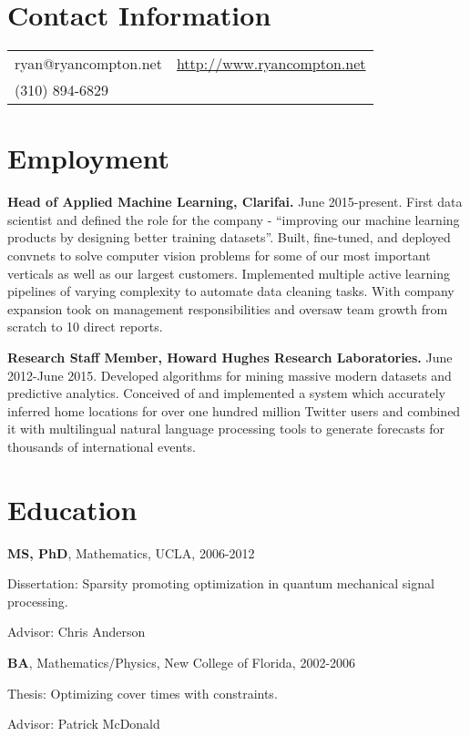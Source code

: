 \documentclass[margin,line]{res}
\newenvironment{list1}{
  \begin{list}{\ding{113}}{%
      \setlength{\itemsep}{0.0in}
      \setlength{\parsep}{0in} \setlength{\parskip}{0in}
      \setlength{\topsep}{0in} \setlength{\partopsep}{0in}
      \setlength{\leftmargin}{0.17in}}}{\end{list}}
\begin{document}

\begin{resume}
\section{\sc Contact Information}
\vspace{.05in}
\begin{tabular}{@{}p{2in}p{4in}}
    ryan@ryancompton.net   &  \url{http://www.ryancompton.net} \\
(310) 894-6829 & \\
\end{tabular}

\section{\sc Employment}
    {\bf Head of Applied Machine Learning, Clarifai.} June 2015-present. First data scientist and defined the role for the company - ``improving our machine learning products by designing better training datasets''. Built, fine-tuned, and deployed convnets to solve computer vision problems for some of our most important verticals as well as our largest customers. Implemented multiple active learning pipelines of varying complexity to automate data cleaning tasks. With company expansion took on management responsibilities and oversaw team growth from scratch to 10 direct reports.

    {\bf Research Staff Member, Howard Hughes Research Laboratories.} June 2012-June 2015. Developed algorithms for mining massive modern datasets and predictive analytics. Conceived of and implemented a system which accurately inferred home locations for over one hundred million Twitter users and combined it with multilingual natural language processing tools to generate forecasts for thousands of international events.

\section{\sc Education}
    {\bf MS, PhD}, Mathematics, UCLA, 2006-2012\\
\vspace*{-.1in}
\begin{list1}
\item [] Dissertation: Sparsity promoting optimization in quantum mechanical signal processing.
\item [] Advisor: Chris Anderson
\end{list1}
    {\bf BA}, Mathematics/Physics, New College of Florida, 2002-2006\\
\vspace*{-.1in}
\begin{list1}
\item [] Thesis: Optimizing cover times with constraints.
\item [] Advisor: Patrick McDonald
\end{list1}


\end{resume}
\end{document}
